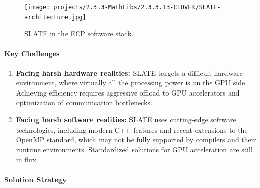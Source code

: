 \begin{figure}[htb]
    \centering
    \texttt{[image: projects/2.3.3-MathLibs/2.3.3.13-CLOVER/SLATE-architecture.jpg]}
    \caption{\label{fig:slate-architecture}
    SLATE in the ECP software stack.}
\end{figure}

\paragraph{Key  Challenges}

\begin{enumerate}


\item
\textbf{Facing harsh hardware realities:}
SLATE targets a difficult hardware environment, where virtually
all the processing power is on the GPU side.
Achieving efficiency requires aggressive offload to GPU accelerators
and optimization of communication bottlenecks.

\item
\textbf{Facing harsh software realities:}
SLATE uses cutting-edge software technologies,
including modern C++ features and recent extensions
to the OpenMP standard, which may not be fully supported by compilers
and their runtime environments.
Standardized solutions for GPU acceleration are still in flux.

\end{enumerate}

\paragraph{Solution Strategy}

